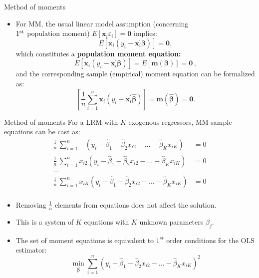 \documentclass{beamer}
\begin{document}
\begin{frame}{Method of moments}
\begin{itemize}
\item For MM, the usual linear model assumption (concerning \\ $1^{\textnormal{st}}$ population moment) $E[\bm{x}_i \varepsilon_i]=\bm{0}$ implies: $$E[\bm{x}_i(y_i-\bm{x}_i^{\prime}\bm{\beta})]=\bm{0},$$ 
which constitutes a \textbf{population moment equation:}
$$
E \left[ \bm{x}_i (y_i - \bm{x}_i^{\prime}\bm{\beta}) \right] 
= E \left[ \bm{m}(\bm{\beta}) \right] = \bm{0}\,,
$$
and the corresponding sample (empirical) moment equation can be formalized as:
$$
\left[ \frac{1}{n} \sum_{i=1}^n \bm{x}_i (y_i - \bm{x}_i^{\prime}\hat{\bm{\beta}}) \right]
= \overline{\bm{m}}(\hat{\bm{\beta}}) = \bm{0}.
$$
\end{itemize}
\end{frame}
\begin{frame}{Method of moments}
For a LRM with $K$ exogenous regressors, MM sample equations can be cast as:
\medskip
\footnotesize
\begin{equation*}
\begin{aligned}
\frac{1}{n}\, \sum_{i=1}^n ~~~~\left( y_i - \hat{\beta}_1 - \hat{\beta}_2 x_{i2} - \dots - \hat{\beta}_K x_{iK} \right) &= 0\\
\frac{1}{n}\, \sum_{i=1}^n  x_{i2} \left( y_i - \hat{\beta}_1 - \hat{\beta}_2 x_{i2} - \dots - \hat{\beta}_K x_{iK} \right) &= 0\\
\dots &\\
\frac{1}{n}\, \sum_{i=1}^n x_{iK} \left( y_i - \hat{\beta}_1 - \hat{\beta}_2 x_{i2} - \dots - \hat{\beta}_K x_{iK} \right) &= 0\\
\end{aligned}
\end{equation*}
\medskip
\begin{itemize}
    \item Removing $\frac{1}{n}$ elements from equations does not affect the solution.
    \item This is a system of $K$ equations with $K$ unknown parameters $\beta_j$.
    \item The set of moment equations is equivalent to $1^{st}$ order conditions for the OLS estimator:
    $$ \underset{\hat{\bm{\beta}}}{\min}\sum_{i=1}^n \left( y_i - \hat{\beta}_1 - \hat{\beta}_2 x_{i2} - \dots - \hat{\beta}_K x_{iK} \right)^2$$
\end{itemize}
\end{frame}
\end{document}

